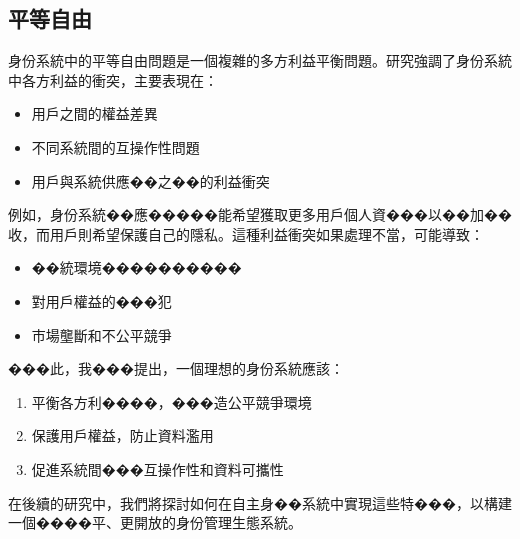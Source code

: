 \subsection{平等自由}
身份系統中的平等自由問題是一個複雜的多方利益平衡問題。研究\cite{preukschat2021self}強調了身份系統中各方利益的衝突，主要表現在：
\begin{itemize}
  \item 用戶之間的權益差異
  \item 不同系統間的互操作性問題
  \item 用戶與系統供應��之��的利益衝突
\end{itemize}
例如，身份系統��應�����能希望獲取更多用戶個人資���以��加��收，而用戶則希望保護自己的隱私。這種利益衝突如果處理不當，可能導致：
\begin{itemize}
  \item ��統環境����������
  \item 對用戶權益的���犯
  \item 市場壟斷和不公平競爭
\end{itemize}
���此，我���提出，一個理想的身份系統應該：
\begin{enumerate}
  \item 平衡各方利����，���造公平競爭環境
  \item 保護用戶權益，防止資料濫用
  \item 促進系統間���互操作性和資料可攜性
\end{enumerate}
在後續的研究中，我們將探討如何在自主身��系統中實現這些特���，以構建一個����平、更開放的身份管理生態系統。
